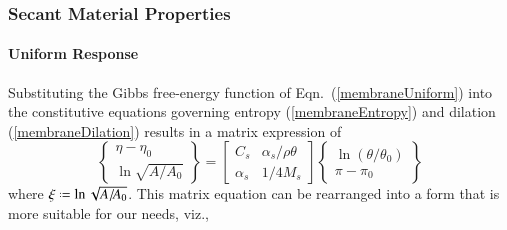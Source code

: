 \subsubsection{Secant Material Properties}

\paragraph{Uniform Response}

Substituting the Gibbs free-energy function of Eqn.~(\ref{membraneUniform}) into the constitutive equations governing entropy (\ref{membraneEntropy}) and dilation (\ref{membraneDilation}) results in a matrix expression of
\begin{displaymath}
    \left\{ \begin{matrix} 
        \eta - \eta_0 \\ \ln \sqrt{A / \! A_0}
    \end{matrix} \right\} = \begin{bmatrix}
        C_s & \alpha_s / \rho \theta \\
        \alpha_s & 1 / 4 M_s
    \end{bmatrix} \left\{ \begin{matrix} 
        \ln ( \theta / \theta_0 ) \\ \pi - \pi_0
    \end{matrix} \right\}
\end{displaymath}
where $\xi \defeq \ln \sqrt{A / \! A_0}$.  This matrix equation can be rearranged into a form that is more suitable for our needs, viz.,

